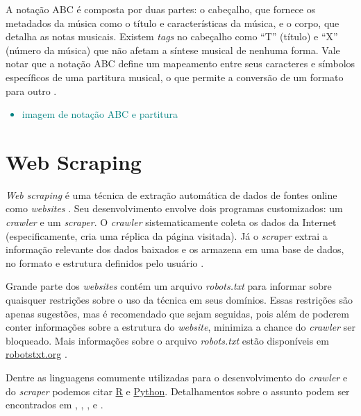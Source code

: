 \documentclass{automatextcc}
\newcommand{\nico}[1]{\textcolor{teal}{#1}}
\begin{document}
A notação ABC é composta por duas partes: o cabeçalho, que fornece os metadados da música como o título e características da música, e o corpo, que detalha as notas musicais. Existem \textit{tags} no cabeçalho como ``T'' (título) e ``X'' (número da música) que não afetam a síntese musical de nenhuma forma. Vale notar que a notação ABC define um mapeamento entre seus caracteres e símbolos específicos de uma partitura musical, o que permite a conversão de um formato para outro \citep{agarwala2017}. 

\nico{
\begin{itemize}
    \item imagem de notação ABC e partitura
\end{itemize}
}


\section{Web Scraping}
\textit{Web scraping} é uma técnica de extração automática de dados de fontes online como \textit{websites} \citep{farley2017,khder2021}. Seu desenvolvimento envolve dois programas customizados: um \textit{crawler} e um \textit{scraper}. O \textit{crawler} sistematicamente coleta os dados da Internet (especificamente, cria uma réplica da página visitada). Já o \textit{scraper} extrai a informação relevante dos dados baixados e os armazena em uma base de dados, no formato e estrutura definidos pelo usuário \citep{lawson2015,patil2016}.

Grande parte dos \textit{websites} contém um arquivo \textit{robots.txt} para informar sobre quaisquer restrições sobre o uso da técnica em seus domínios. Essas restrições são apenas sugestões, mas é recomendado que sejam seguidas, pois além de poderem conter informações sobre a estrutura do \textit{website}, minimiza a chance do \textit{crawler} ser bloqueado. Mais informações sobre o arquivo \textit{robots.txt} estão disponíveis em \url{robotstxt.org} \citep{lawson2015}.

Dentre as linguagens comumente utilizadas para o desenvolvimento do \textit{crawler} e do \textit{scraper} podemos citar \href{https://cran.r-project.org}{R} e \href{https://python.org/}{Python}. Detalhamentos sobre o assunto podem ser encontrados em \citet{lawson2015}, \citet{sirisuriya2015}, \citet{patil2016}, \citet{farley2017} e \citet{khder2021}.



\end{document}
